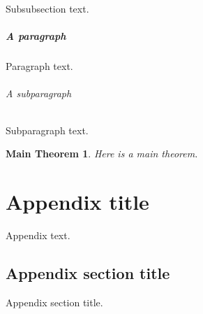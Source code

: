 \documentclass{amsbook}
\newtheorem{main_thm}{Main Theorem}
\begin{document}
Subsubsection text.

\paragraph{A paragraph}
\label{ref:par}

Paragraph text.

\subparagraph{A subparagraph}
\label{ref:subpar}

Subparagraph text.

\begin{main_thm}\label{ref:main}
Here is a main theorem.
\end{main_thm}

\appendix

\chapter{Appendix title}
\label{ref:app}

Appendix text.

\section{Appendix section title}
\label{ref:appsec}

Appendix section title.
\end{document}
